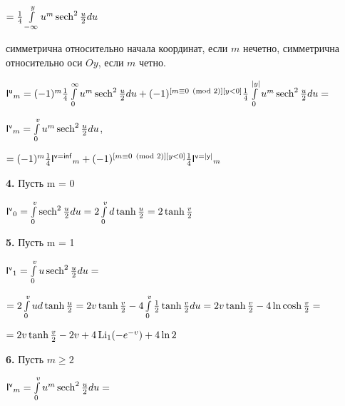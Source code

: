 \documentclass[a4paper,12pt]{article}
\begin{document}
\begin{center}
    $= {1\over{4}}\int\limits_{-\infty}^y u^m \operatorname{sech}^2{u\over{2}} d u$
\end{center}

 симметрична относительно начала координат, если $m$ нечетно, симметрична относительно оси $O y$, если $m$ четно. 

\begin{center}
    $\mathsf{I^u}_m = (-1)^m{1\over{4}} \int\limits_0^{\infty} u^m \operatorname{sech}^2{u\over{2}} d u  + (-1)^{[m \equiv 0 \pmod{2}][y < 0]}{1\over{4}}  \int\limits_0^{|y|} u^m \operatorname{sech}^2{u\over{2}} d u = $
\end{center}

 $\mathsf{I^{v}}_m = \int\limits_0^{v} u^m \operatorname{sech}^2{u\over{2}} d u$, 

\begin{center}
    $= (-1)^m {1\over{4}} \mathsf{I^{v = inf}}_m  + (-1)^{[m \equiv 0 \pmod{2}][y < 0]} {1\over{4}} \mathsf{I^{v = |y|}}_m$
\end{center}

\noindent\textbf{4.} Пусть m = 0

\begin{center}
    $\mathsf{I^{v}}_0 = \int\limits_0^{v} \operatorname{sech}^2{u\over{2}} d u = 2\int\limits_{0}^v d\operatorname{tanh}{u\over{2}} = 2 \operatorname{tanh}{v\over{2}}$
\end{center}

\noindent\textbf{5.} Пусть m = 1

\begin{center}
    $\mathsf{I^{v}}_1 = \int\limits_0^{v} u \operatorname{sech}^2{u\over{2}} d u =$
\end{center}

\begin{center}
    $= 2\int\limits_{0}^v u d\operatorname{tanh}{u\over{2}} = 2v \operatorname{tanh}{v\over{2}} - 4\int\limits_0^v {1\over{2}} \operatorname{tanh}{v\over{2}}du = 2v\operatorname{tanh}{v\over{2}} - 4\ln{\operatorname{cosh}{v\over{2}}} =$
\end{center}

\begin{center}
    $= 2v\operatorname{tanh}{v\over{2}} - 2v + 4\operatorname{Li_1}(-e^{-v}) + 4\ln{2}$
\end{center}

\noindent\textbf{6.} Пусть $m \geq{2}$

\begin{center}
    $\mathsf{I^{v}}_m = \int\limits_0^{v} u^m \operatorname{sech}^2{u\over{2}} d u =$
\end{center}
\end{document}

